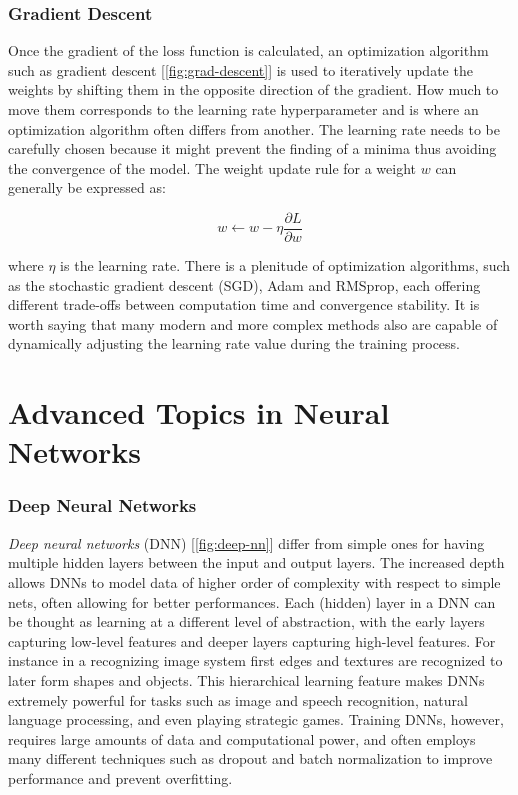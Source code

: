 \documentclass[../Thesis.tex]{subfiles}
\begin{document}
	
	
	\subsubsection{Gradient Descent}
		
	Once the gradient of the loss function is calculated, an optimization algorithm such as gradient descent [\autoref{fig:grad-descent}] is used to iteratively update the weights by shifting them in the opposite direction of the gradient. How much to move them corresponds to the learning rate hyperparameter and is where an optimization algorithm often differs from another. The learning rate needs to be carefully chosen because it might prevent the finding of a minima thus avoiding the convergence of the model. The weight update rule for a weight \(w\) can generally be expressed as:
	
	\[
	w \leftarrow w - \eta \frac{\partial L}{\partial w}
	\]
	
	where \(\eta\) is the learning rate. There is a plenitude of optimization algorithms, such as the stochastic gradient descent (SGD), Adam and RMSprop, each offering different trade-offs between computation time and convergence stability. It is worth saying that many modern and more complex methods also are capable of dynamically adjusting the learning rate value during the training process.
	
	
	
	\section{Advanced Topics in Neural Networks}
	
	\subsubsection{Deep Neural Networks}
	\emph{Deep neural networks} (DNN) [\autoref{fig:deep-nn}] differ from simple ones for having multiple hidden layers between the input and output layers. The increased depth allows DNNs to model data of higher order of complexity with respect to simple nets, often allowing for better performances. Each (hidden) layer in a DNN can be thought as learning at a different level of abstraction, with the early layers capturing low-level features and deeper layers capturing high-level features. For instance in a recognizing image system first edges and textures are recognized to later form shapes and objects. This hierarchical learning feature makes DNNs extremely powerful for tasks such as image and speech recognition, natural language processing, and even playing strategic games. Training DNNs, however, requires large amounts of data and computational power, and often employs many different techniques such as dropout and batch normalization to improve performance and prevent overfitting.
	
\end{document}
